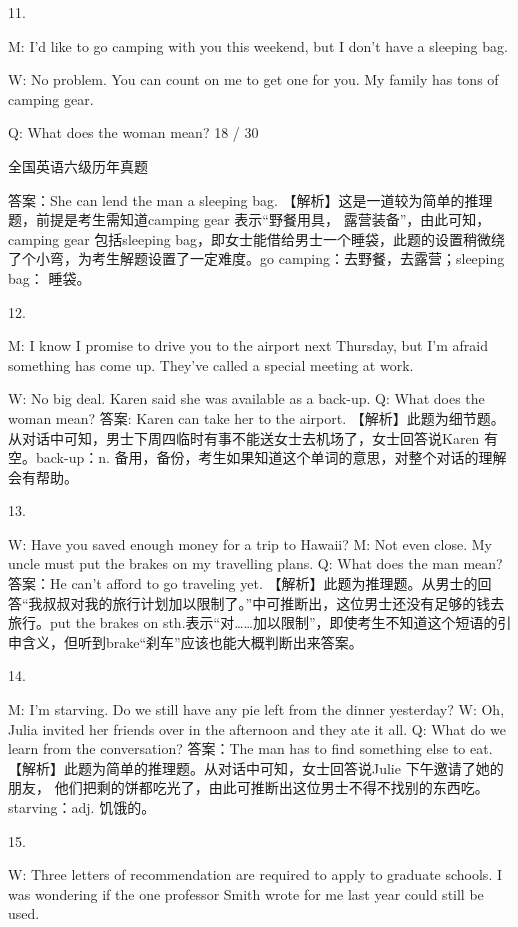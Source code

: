 \documentclass[UTF8,11pt]{ctexart}
\begin{document}
11.


M: I’d like to go camping with you this weekend, but I don’t have a sleeping bag.


W: No problem. You can count on me to get one for you. My family has tons of camping gear.


Q: What does the woman mean? 18 / 30


全国英语六级历年真题


答案：She can lend the man a sleeping bag. 【解析】这是一道较为简单的推理题，前提是考生需知道camping gear 表示“野餐用具， 露营装备”，由此可知，camping gear 包括sleeping bag，即女士能借给男士一个睡袋，此题的设置稍微绕了个小弯，为考生解题设置了一定难度。go camping：去野餐，去露营；sleeping bag： 睡袋。


12.


M: I know I promise to drive you to the airport next Thursday, but I’m afraid something has come up. They’ve called a special meeting at work.


W: No big deal. Karen said she was available as a back-up. Q: What does the woman mean? 答案: Karen can take her to the airport. 【解析】此题为细节题。从对话中可知，男士下周四临时有事不能送女士去机场了，女士回答说Karen 有空。back-up：n. 备用，备份，考生如果知道这个单词的意思，对整个对话的理解会有帮助。


13.


W: Have you saved enough money for a trip to Hawaii? M: Not even close. My uncle must put the brakes on my travelling plans. Q: What does the man mean? 答案：He can’t afford to go traveling yet. 【解析】此题为推理题。从男士的回答“我叔叔对我的旅行计划加以限制了。”中可推断出，这位男士还没有足够的钱去旅行。put the brakes on sth.表示“对……加以限制”，即使考生不知道这个短语的引申含义，但听到brake“刹车”应该也能大概判断出来答案。


14.


M: I’m starving. Do we still have any pie left from the dinner yesterday? W: Oh, Julia invited her friends over in the afternoon and they ate it all. Q: What do we learn from the conversation? 答案：The man has to find something else to eat. 【解析】此题为简单的推理题。从对话中可知，女士回答说Julie 下午邀请了她的朋友， 他们把剩的饼都吃光了，由此可推断出这位男士不得不找别的东西吃。starving：adj. 饥饿的。


15.


W: Three letters of recommendation are required to apply to graduate schools. I was wondering if the one professor Smith wrote for me last year could still be used.
\end{document}
